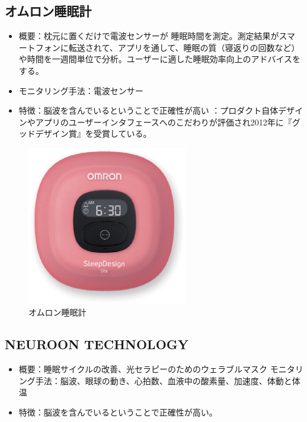 \subsection{オムロン睡眠計}
\begin{itemize}
\item 概要：枕元に置くだけで電波センサーが 睡眠時間を測定。測定結果がスマートフォンに転送されて、アプリを通して、睡眠の質（寝返りの回数など）や時間を一週間単位で分析。ユーザーに適した睡眠効率向上のアドバイスをする。
\item モニタリング手法：電波センサー\cite{omron}
\item 特徴：脳波を含んでいるということで正確性が高い
：プロダクト自体デザインやアプリのユーザーインタフェースへのこだわりが評価され2012年に『グッドデザイン賞』を受賞している。
\end{itemize}

\begin{figure}[htbp]
\begin{center}
\includegraphics[width=7cm]{eps/omuron.eps}
\caption{オムロン睡眠計}
\label{omuron}
\end{center}
\end{figure}

\subsection{NEUROON TECHNOLOGY}
\begin{itemize}
\item 概要：睡眠サイクルの改善、光セラピーのためのウェラブルマスク
モニタリング手法：脳波、眼球の動き、心拍数、血液中の酸素量、加速度、体動と体温 \cite{neuroon}
\item 特徴：脳波を含んでいるということで正確性が高い。
\end{itemize}

